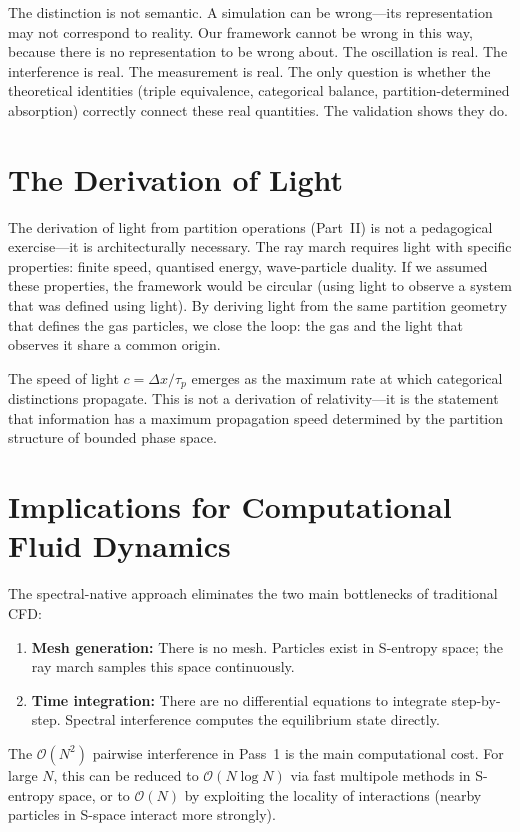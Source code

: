 \documentclass[twocolumn,10pt,a4paper]{article}
\theoremstyle{plain}
\theoremstyle{definition}
\theoremstyle{remark}
\newcommand{\taup}{\tau_p}
\newcommand{\BigO}{\mathcal{O}}
\begin{document}
The distinction is not semantic. A simulation can be wrong---its representation may not correspond to reality. Our framework cannot be wrong in this way, because there is no representation to be wrong about. The oscillation is real. The interference is real. The measurement is real. The only question is whether the theoretical identities (triple equivalence, categorical balance, partition-determined absorption) correctly connect these real quantities. The validation shows they do.

\section{The Derivation of Light}
\label{sec:light_discuss}

The derivation of light from partition operations (Part~II) is not a pedagogical exercise---it is architecturally necessary. The ray march requires light with specific properties: finite speed, quantised energy, wave-particle duality. If we assumed these properties, the framework would be circular (using light to observe a system that was defined using light). By deriving light from the same partition geometry that defines the gas particles, we close the loop: the gas and the light that observes it share a common origin.

The speed of light $c = \Delta x/\taup$ emerges as the maximum rate at which categorical distinctions propagate. This is not a derivation of relativity---it is the statement that information has a maximum propagation speed determined by the partition structure of bounded phase space.

\section{Implications for Computational Fluid Dynamics}
\label{sec:implications}

The spectral-native approach eliminates the two main bottlenecks of traditional CFD:
\begin{enumerate}
    \item \textbf{Mesh generation:} There is no mesh. Particles exist in S-entropy space; the ray march samples this space continuously.
    \item \textbf{Time integration:} There are no differential equations to integrate step-by-step. Spectral interference computes the equilibrium state directly.
\end{enumerate}

The $\BigO(N^2)$ pairwise interference in Pass~1 is the main computational cost. For large $N$, this can be reduced to $\BigO(N \log N)$ via fast multipole methods in S-entropy space, or to $\BigO(N)$ by exploiting the locality of interactions (nearby particles in S-space interact more strongly).
\end{document}
